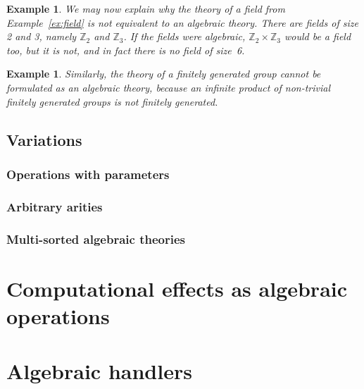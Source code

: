 \documentclass{amsart}
\newcommand{\ZZ}{\mathbb{Z}}
\newtheorem{example}[definition]{Example}
\begin{document}
\begin{example}
  We may now explain why the theory of a field from Example~\ref{ex:field} is not
  equivalent to an algebraic theory. There are fields of size 2 and 3, namely $\ZZ_2$ and
  $\ZZ_3$. If the fields were algebraic, $\ZZ_2 \times \ZZ_3$ would be a field too, but it
  is not, and in fact there is no field of size~6.
\end{example}

\begin{example}
  Similarly, the theory of a finitely generated group cannot be formulated as an algebraic
  theory, because an infinite product of non-trivial finitely generated groups is not
  finitely generated.
\end{example}


\subsection{Variations}
\label{sec:variations}

\subsubsection{Operations with parameters}
\label{sec:oper-with-param}

\subsubsection{Arbitrary arities}
\label{sec:arbitrary-arities}

\subsubsection{Multi-sorted algebraic theories}
\label{sec:multi-sort-algebr}


\section{Computational effects as algebraic operations}
\label{sec:comp-effects-as}

\section{Algebraic handlers}
\label{sec:algebraic-handlers}
\end{document}
